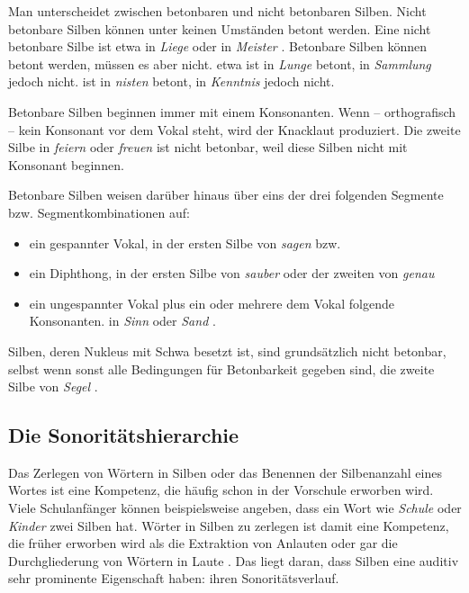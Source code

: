 Man unterscheidet zwischen betonbaren und nicht betonbaren Silben. Nicht betonbare Silben können unter keinen Umständen betont werden. Eine nicht betonbare Silbe ist etwa \textipa{[g@]} in \textit{Liege} \textipa{[\textprimstress li:.g@]} oder \textipa{[t5]} in \textit{Meister} \textipa{[\textprimstress m\t*{aI}s.t5]}. Betonbare Silben können betont werden, müssen es aber nicht. \textipa{[lUN]} etwa ist in \textit{Lunge} \textipa{[\textprimstress lU\.*N@]} betont, in \textit{Sammlung}  jedoch nicht. \textipa{[nIs]} ist in \textit{nisten}  betont, in \textit{Kenntnis}  jedoch nicht.

Betonbare Silben beginnen immer mit einem Konsonanten. Wenn -- orthografisch -- kein Konsonant vor dem Vokal steht, wird der Knacklaut produziert. Die zweite Silbe in \textit{feiern} \textipa{[\textprimstress f\t*{aI}.5n]} oder \textit{freuen} \textipa{[\textprimstress fK\t*{OI}.@n]} ist nicht betonbar, weil diese Silben nicht mit Konsonant beginnen.

Betonbare Silben weisen darüber hinaus über eins der drei folgenden Segmente bzw. Segmentkombinationen auf:
\begin{itemize}
\item ein gespannter Vokal, \zB in der ersten Silbe von \textit{sagen} \textipa{[\textprimstress za:.g@n]} bzw. \textipa{[\textprimstress za:.g\s{N}]}
\item ein Diphthong, \zB in der ersten Silbe von \textit{sauber} \textipa{[\textprimstress z\t*{aU}.b5]} oder der zweiten von \textit{genau} \textipa{[g@\textprimstress n\t*{aU}]}
\item ein ungespannter Vokal plus ein oder mehrere dem Vokal folgende Konsonanten. \zB in \textit{Sinn}  oder \textit{Sand} .
\end{itemize}

Silben, deren Nukleus mit Schwa besetzt ist, sind grundsätzlich nicht betonbar, selbst wenn sonst alle Bedingungen für Betonbarkeit gegeben sind, \zB die zweite Silbe von \textit{Segel }\textipa{[\textprimstress ze:.g@l]}.


\subsection{Die Sonoritätshierarchie}\label{subsec:Sonoritaet}
Das Zerlegen von Wörtern in Silben oder das Benennen der Silbenanzahl eines Wortes ist eine Kompetenz, die häufig schon in der Vorschule erworben wird. Viele Schulanfänger können beispielsweise angeben, dass ein Wort wie \textit{Schule} oder \textit{Kinder} zwei Silben hat. Wörter in Silben zu zerlegen ist damit eine Kompetenz, die früher erworben wird als die Extraktion von Anlauten oder gar die Durchgliederung von Wörtern in Laute \citep{ZieglerGoswami2005}. Das liegt daran, dass Silben eine auditiv sehr prominente Eigenschaft haben: ihren Sonoritätsverlauf. 

